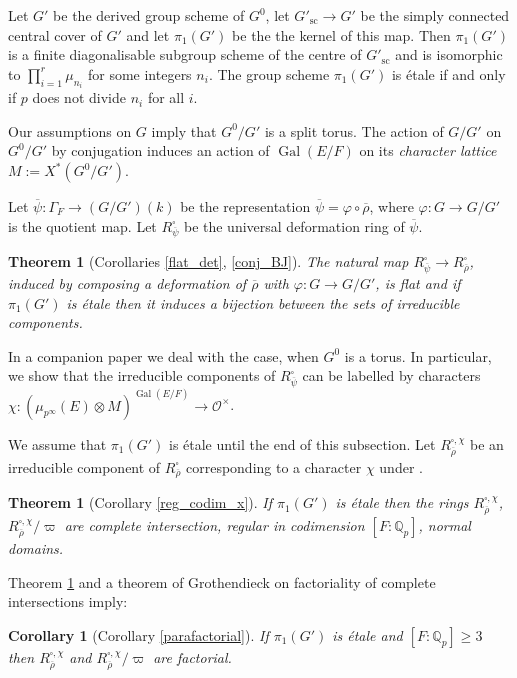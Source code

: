 \documentclass{amsart}
\newtheorem{cor}[prop]{Corollary}
\newtheorem{thm}[prop]{Theorem}
\theoremstyle{definition}
\theoremstyle{remark}
\DeclareMathOperator{\Gal}{Gal}
\newcommand{\Qp}{\mathbb {Q}_p}
\newcommand{\OO}{\mathcal O}
\newcommand{\rhobar}{\overline{\rho}}
\newcommand{\psibar}{\overline{\psi}}
\newcommand{\sic}{\operatorname{sc}}
\begin{document}
Let $G'$ be the 
derived group scheme of $G^0$, let $G'_{\sic}\rightarrow G'$ 
be the simply connected central cover of $G'$ and let $\pi_1(G')$ be the the kernel of this map. Then $\pi_1(G')$ is a finite diagonalisable subgroup 
scheme of the centre of $G'_{\sic}$ and is isomorphic to $\prod_{i=1}^r \mu_{n_i}$ for some integers $n_i$. The group scheme $\pi_1(G')$
is \'etale if and only if $p$ does not divide $n_i$ for all $i$.

Our assumptions on $G$ imply that 
$G^0/G'$ is a split torus.
The action of $G/G'$ on $G^0/G'$ by conjugation induces an action of 
$\Gal(E/F)$ on its \emph{character lattice} $M:=X^*(G^0/G')$. 

Let $\psibar: \Gamma_F \rightarrow (G/G')(k)$ be the representation 
$\psibar= \varphi\circ \rhobar$, where $\varphi: G\rightarrow G/G'$ is 
the quotient map. Let $R^{\square}_{\psibar}$ be the universal 
deformation ring of $\psibar$.


\begin{thm}[Corollaries \ref{flat_det},
\ref{conj_BJ}]\label{thm_intro-2}
The natural  map $R^{\square}_{\psibar}\to R^{\square}_{\rhobar}$, induced by composing 
a deformation of $\rhobar$ with $\varphi: G\rightarrow G/G'$, is flat and if $\pi_1(G')$ is \'etale then it induces a bijection between the sets of irreducible components. 
\end{thm}

In a companion paper \cite{defT} we deal with the case, when $G^0$ is a torus. In particular, we show that the irreducible components 
of $R^{\square}_{\psibar}$ can be labelled by characters $\chi: 
(\mu_{p^{\infty}}(E)\otimes M)^{\Gal(E/F)}\rightarrow \OO^{\times}$. 

We assume that $\pi_1(G')$ is \'etale until the end of this subsection. 
Let $R^{\square, \chi}_{\rhobar}$ be an irreducible component of $R^{\square}_{\rhobar}$ corresponding to a character $\chi$ under . 

\begin{thm}[Corollary \ref{reg_codim_x}]\label{thm_intro-3} If $\pi_1(G')$ is \'etale then the rings $R^{\square, \chi}_{\rhobar}$,
$R^{\square, \chi}_{\rhobar}/\varpi$ are complete intersection, regular in codimension 
$[F:\Qp]$, normal domains. 
\end{thm}



Theorem \ref{thm_intro-3} and a theorem of Grothendieck on factoriality of 
complete intersections imply:

\begin{cor}[Corollary \ref{parafactorial}]\label{cor_intro_para} If 
$\pi_1(G')$ is \'etale and $[F:\Qp]\ge 3$ then $R^{\square, \chi}_{\rhobar}$ and $R^{\square, \chi}_{\rhobar}/\varpi$ are factorial. 
\end{cor}
\end{document}
